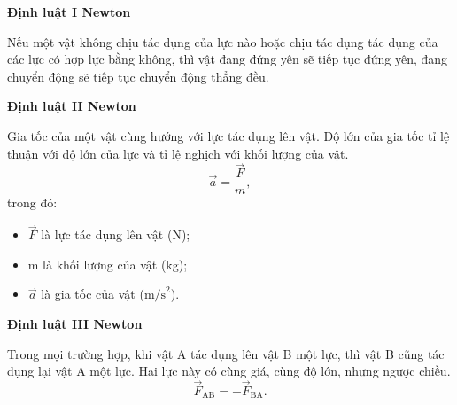 \setcounter{section}{0}
\textbf{Định luật I Newton}

Nếu một vật không chịu tác dụng của lực nào hoặc chịu tác dụng tác dụng của các lực có hợp lực bằng không, thì vật đang đứng yên sẽ tiếp tục đứng yên, đang chuyển động sẽ tiếp tục chuyển động thẳng đều.

\textbf{Định luật II Newton}

Gia tốc của một vật cùng hướng với lực tác dụng lên vật. Độ lớn của gia tốc tỉ lệ thuận với độ lớn của lực và tỉ lệ nghịch với khối lượng của vật.
\begin{equation*}
	\vec{a}=\dfrac{\vec F}{m},
\end{equation*}
trong đó:
\begin{itemize}
	\item $\vec F$ là lực tác dụng lên vật (N);
	\item m là khối lượng của vật (kg);
	\item $\vec a$ là gia tốc của vật ($\text{m/s}^2$).
\end{itemize}

\textbf{Định luật III Newton}

Trong mọi trường hợp, khi vật A tác dụng lên vật B một lực, thì vật B cũng tác dụng lại vật A một lực. Hai lực này có cùng giá, cùng độ lớn, nhưng ngược chiều.
\begin{equation*}
	{\vec F}_{\text{AB}}=-{\vec F}_{\text{BA}}.
\end{equation*}
